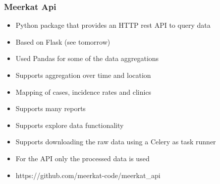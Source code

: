 \documentclass{beamer}
\begin{document}
\begin{frame}
    \frametitle{Meerkat Api}
    \begin{itemize}
    \item Python package that provides an HTTP rest API to query data
    \item Based on Flask (see tomorrow)
    \item Used Pandas for some of the data aggregations
    \item Supports aggregation over time and location
    \item Mapping of cases, incidence rates and clinics
    \item Supports many reports
    \item Supports explore data functionality
    \item Supports downloading the raw data using a Celery as task runner
    \item For the API only the processed data is used
    \item https://github.com/meerkat-code/meerkat\_api
    \end{itemize}
\end{frame}
\end{document}
